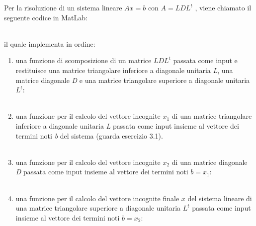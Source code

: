 Per la risoluzione di un sistema lineare $Ax=b$ con $A=LDL^t$ , viene chiamato il seguente codice in MatLab:\\\

il quale implementa in ordine:
\begin{enumerate}
\item
una funzione di scomposizione di un matrice $LDL^t$ passata come input e restituisce una matrice triangolare inferiore a diagonale unitaria \textit{L}, una matrice diagonale \textit{D} e una matrice triangolare superiore a diagonale unitaria $L^t$:\\\

\item
una funzione per il calcolo del vettore incognite $x_1$ di una matrice triangolare inferiore a diagonale unitaria \textit{L} passata come input insieme al vettore dei termini noti \textit{b} del sistema (guarda esercizio 3.1). \\\
\item
una funzione per il calcolo del vettore incognite $x_2$ di una matrice diagonale \textit{D} passata come input insieme al vettore dei termini noti $b=x_1$:\\\

\item
una funzione per il calcolo del vettore incognite finale $x$ del sistema lineare di una matrice triangolare superiore a diagonale unitaria $L^t$ passata come input insieme al vettore dei termini noti $b=x_2$:\\\

\end{enumerate}